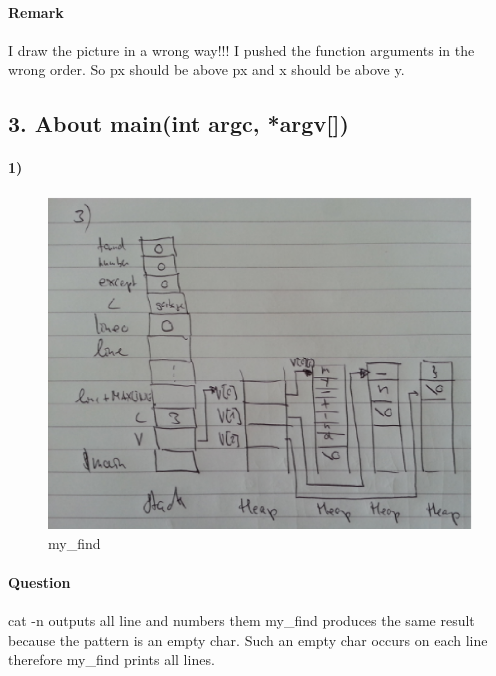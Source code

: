 \documentclass[12pt]{article}
\begin{document}
\paragraph{Remark} 
I draw the picture in a wrong way!!! I pushed the function arguments in the wrong order. So px should be above px and x should be above y. 

\subsection*{3. About main(int argc, *argv[])}
\paragraph{1)} \quad

\begin{figure}[!htb]
\centering
\includegraphics[scale=0.5]{eps/3.eps}  
\caption{my\_find}
\end{figure}

\paragraph{Question}
cat -n outputs all line and numbers them
my\_find produces the same result because the pattern is an empty char. Such an empty char occurs on each line therefore my\_find prints all lines.
\end{document}
